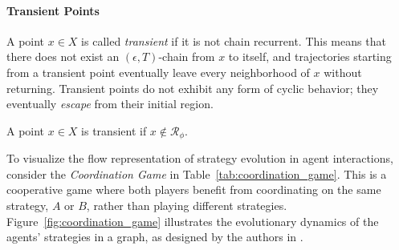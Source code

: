         \paragraph{Transient Points}

            A point $x \in X$ is called \emph{transient} if it is not chain recurrent. This means that there does not exist an $(\epsilon, T)$-chain from $x$ to itself, and trajectories starting from a transient point eventually leave every neighborhood of $x$ without returning. Transient points do not exhibit any form of cyclic behavior; they eventually \emph{escape} from their initial region.
        
            \begin{definition}
                A point $x \in X$ is transient if $x \notin \mathcal{R}_\phi$.
            \end{definition}

        \noindent
        To visualize the flow representation of strategy evolution in agent interactions, consider the \emph{Coordination Game} in Table~\ref{tab:coordination_game}. This is a cooperative game where both players benefit from coordinating on the same strategy, $A$ or $B$, rather than playing different strategies. Figure~\ref{fig:coordination_game} illustrates the evolutionary dynamics of the agents' strategies in a graph, as designed by the authors in \cite{omidshafiei2019alpharank}.\tinydouble


